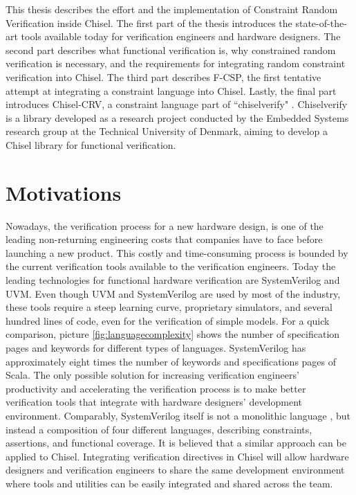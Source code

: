 This thesis describes the effort and the implementation of Constraint Random
Verification inside Chisel. The first part of the thesis introduces the
state-of-the-art tools available today for verification engineers and hardware
designers. The second part describes what functional verification is, why
constrained random verification is necessary, and the requirements for
integrating random constraint verification into Chisel. The third part describes
F-CSP, the first tentative attempt at integrating a constraint language into
Chisel. Lastly, the final part introduces Chisel-CRV, a constraint language part
of ``chiselverify" \cite{github:chiselverify}. Chiselverify is a library
developed as a research project conducted by the Embedded Systems research group
at the Technical University of Denmark, aiming to develop a Chisel library for
functional verification.


\section{Motivations}
Nowadays, the verification process for a new hardware design, is one of the
leading non-returning engineering costs that companies have to face before
launching a new product. This costly and time-consuming process is bounded by
the current verification tools available to the verification engineers. Today
the leading technologies for functional hardware verification are SystemVerilog
and UVM. Even though UVM and SystemVerilog are used by most of the industry,
these tools require a steep learning curve, proprietary simulators, and several
hundred lines of code, even for the verification of simple models. For a quick
comparison, picture \ref{fig:languagecomplexity} shows the number of
specification pages and keywords for different types of languages. SystemVerilog
has approximately eight times the number of keywords and specifications pages of
Scala. The only possible solution for increasing verification engineers'
productivity and accelerating the verification process is to make better
verification tools that integrate with hardware designers' development
environment. Comparably, SystemVerilog itself is not a monolithic language
\cite{mehta2018asic}, but instead a composition of four different languages,
describing constraints, assertions, and functional coverage. It is believed that
a similar approach can be applied to Chisel. Integrating verification directives
in Chisel will allow hardware designers and verification engineers to share the
same development environment where tools and utilities can be easily integrated
and shared across the team.



